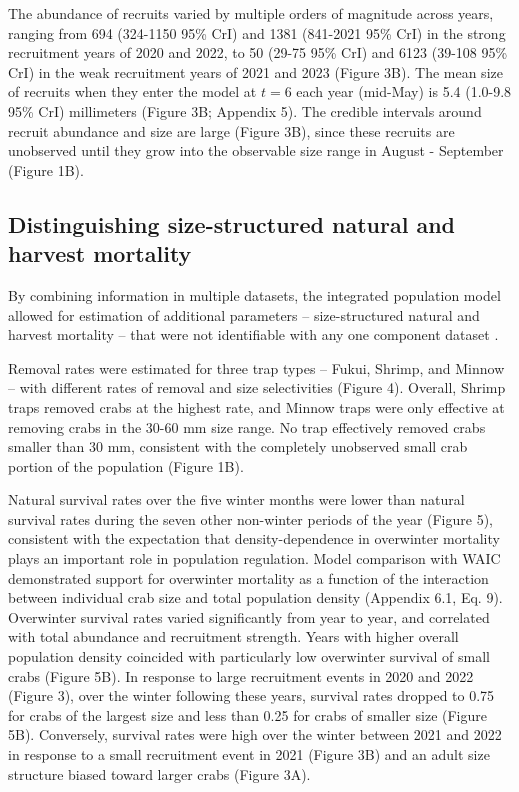 \documentclass{article}
\begin{document}
The abundance of recruits varied by multiple orders of magnitude across years, ranging from 694 (324-1150 95\% CrI) and 1381 (841-2021 95\% CrI) in the strong recruitment years of 2020 and 2022, to 50 (29-75 95\% CrI) and 6123 (39-108 95\% CrI) in the weak recruitment years of 2021 and 2023 (Figure 3B). The mean size of recruits when they enter the model at $t = 6$ each year (mid-May) is 5.4 (1.0-9.8 95\% CrI) millimeters (Figure 3B; Appendix 5). The credible intervals around recruit abundance and size are large (Figure 3B), since these recruits are unobserved until they grow into the observable size range in August - September (Figure 1B).

\subsection{Distinguishing size-structured natural and harvest mortality}

By combining information in multiple datasets, the integrated population model allowed for estimation of additional parameters -- size-structured natural and harvest mortality -- that were not identifiable with any one component dataset \parencite{riecke2019integrated}.

Removal rates were estimated for three trap types -- Fukui, Shrimp, and Minnow -- with different rates of removal and size selectivities (Figure 4). Overall, Shrimp traps removed crabs at the highest rate, and Minnow traps were only effective at removing crabs in the 30-60 mm size range. No trap effectively removed crabs smaller than 30 mm, consistent with the completely unobserved small crab portion of the population (Figure 1B).

Natural survival rates over the five winter months were lower than natural survival rates during the seven other non-winter periods of the year (Figure 5), consistent with the expectation that density-dependence in overwinter mortality plays an important role in population regulation. Model comparison with WAIC demonstrated support for overwinter mortality as a function of the interaction between individual crab size and total population density (Appendix 6.1, Eq. 9). Overwinter survival rates varied significantly from year to year, and correlated with total abundance and recruitment strength. Years with higher overall population density coincided with particularly low overwinter survival of small crabs (Figure 5B). In response to large recruitment events in 2020 and 2022 (Figure 3), over the winter following these years, survival rates dropped to 0.75 for crabs of the largest size and less than 0.25 for crabs of smaller size (Figure 5B). Conversely, survival rates were high over the winter between 2021 and 2022 in response to a small recruitment event in 2021 (Figure 3B) and an adult size structure biased toward larger crabs (Figure 3A). 
\end{document}
